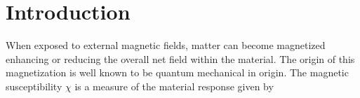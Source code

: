 \documentclass[
aps,
pra,
twocolumn,
showpacs,
preprintnumbers,
amsmath,
amssymb,
footinbib
]{revtex4-2}
\begin{document}
\section{Introduction}\label{sec:CHIsec}
\noindent When exposed to external magnetic fields, matter can become magnetized enhancing or reducing the overall net field within the material. The origin of this magnetization is well known to be quantum mechanical in origin. The magnetic susceptibility $\chi$ is a measure of the material response given by
\end{document}

